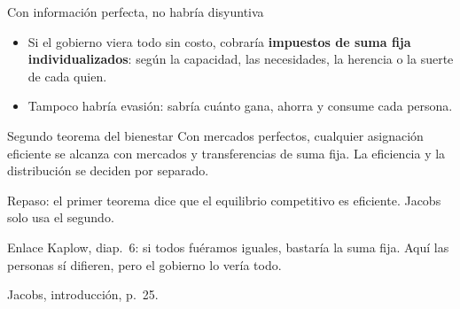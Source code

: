 \documentclass[aspectratio=169,11pt]{beamer}
\newcommand{\fuente}[1]{\par\vfill{\small\color{cGris}#1\par}}
\begin{document}
\begin{frame}{Con información perfecta, no habría disyuntiva}
  \begin{itemize}
    \item Si el gobierno viera todo sin costo, cobraría \textbf{impuestos de suma fija individualizados}: según la capacidad, las necesidades, la herencia o la suerte de cada quien.
    \item Tampoco habría evasión: sabría cuánto gana, ahorra y consume cada persona.
  \end{itemize}
  \pause
  \begin{block}{Segundo teorema del bienestar}
    Con mercados perfectos, cualquier asignación eficiente se alcanza con mercados y transferencias de suma fija. La eficiencia y la distribución se deciden por separado.
  \end{block}
  {\small\color{cGris}Repaso: el primer teorema dice que el equilibrio competitivo es eficiente. Jacobs solo usa el segundo.}
  \pause
  \begin{block}{Enlace}
    Kaplow, diap.~6: si todos fuéramos iguales, bastaría la suma fija. Aquí las personas sí difieren, pero el gobierno lo vería todo.
  \end{block}
  \fuente{Jacobs, introducción, p.~25.}
\end{frame}
\end{document}
